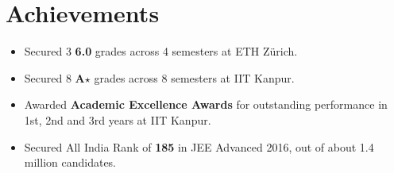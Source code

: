 \section*{Achievements}
\begin{itemize}[leftmargin=*,itemsep=0mm,label={\footnotesize\textbullet}]

\item Secured 3 \textbf{6.0} grades across 4 semesters at ETH Zürich.
\item Secured 8 \textbf{A$\star$} grades across 8 semesters at IIT Kanpur.
\item Awarded \textbf{Academic Excellence Awards} for outstanding performance in 1st, 2nd and 3rd years at IIT Kanpur.
\item Secured All India Rank of \textbf{185} in JEE Advanced 2016, out of about 1.4 million candidates.

\end{itemize}
